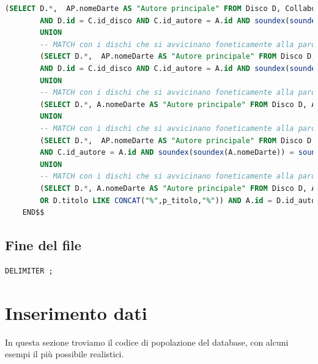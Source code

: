 \documentclass{article}
\begin{document}
\begin{lstlisting}[language=SQL]
        (SELECT D.*,  AP.nomeDarte AS "Autore principale" FROM Disco D, Collabora C, Autore A, Autore AP WHERE D.titolo LIKE CONCAT("%",p_titolo,"%") 
        AND D.id = C.id_disco AND C.id_autore = A.id AND soundex(soundex(A.nomeDarte)) = soundex(soundex(p_nomeDarte)) AND AP.id = D.id_autore )
        UNION
        -- MATCH con i dischi che si avvicinano foneticamente alla parola cercata sia come titolo nel titolo che come autore nell'autore secondario
        (SELECT D.*,  AP.nomeDarte AS "Autore principale" FROM Disco D, Collabora C, Autore A, Autore AP WHERE soundex(soundex(D.titolo)) = soundex(soundex(p_titolo)) 
        AND D.id = C.id_disco AND C.id_autore = A.id AND soundex(soundex(A.nomeDarte)) = soundex(soundex(p_nomeDarte)) AND AP.id = D.id_autore)
        UNION
        -- MATCH con i dischi che si avvicinano foneticamente alla parola cercata come autore nell'autore principale e con qualsiasi titolo
        (SELECT D.*, A.nomeDarte AS "Autore principale" FROM Disco D, Autore A WHERE D.id_autore = A.id AND soundex(soundex(A.nomeDarte)) = soundex(soundex(p_nomeDarte)))
        UNION
        -- MATCH con i dischi che si avvicinano foneticamente alla parola cercata come autore negli autori secondari e con qualsiasi titolo
        (SELECT D.*,  AP.nomeDarte AS "Autore principale" FROM Disco D, Collabora C, Autore A, Autore AP WHERE D.id = C.id_disco 
        AND C.id_autore = A.id AND soundex(soundex(A.nomeDarte)) = soundex(soundex(p_nomeDarte)) AND AP.id = D.id_autore) 
        UNION
        -- MATCH con i dischi che si avvicinano foneticamente alla parola cercata come titolo nel titolo e con qualsiasi autore
        (SELECT D.*, A.nomeDarte AS "Autore principale" FROM Disco D, Autore A WHERE (soundex(soundex(D.titolo)) = soundex(soundex(p_titolo)) 
        OR D.titolo LIKE CONCAT("%",p_titolo,"%")) AND A.id = D.id_autore);
    END$$
\end{lstlisting}

\subsection*{Fine del file}

\begin{lstlisting}[language=SQL]
    DELIMITER ;
\end{lstlisting}

\pagebreak
\section{Inserimento dati}
In questa sezione troviamo il codice di popolazione del database, con alcuni esempi il più possibile realistici.
\end{document}
